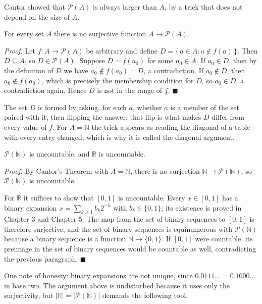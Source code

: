 Cantor showed that $\mathcal{P}(A)$ is always larger than $A$, by a trick that does not
depend on the size of $A$.

\begin{teorema}[Cantor]
For every set $A$ there is no surjective function $A \to \mathcal{P}(A)$.
\end{teorema}
\par\smallskip\noindent\textit{Proof.} Let $f : A \to \mathcal{P}(A)$ be arbitrary
and define $D = \{\, a \in A : a \notin f(a) \,\}$. Then $D \subseteq A$, so
$D \in \mathcal{P}(A)$. Suppose $D = f(a_0)$ for some $a_0 \in A$. If
$a_0 \in D$, then by the definition of $D$ we have $a_0 \notin f(a_0) = D$, a
contradiction. If $a_0 \notin D$, then $a_0 \notin f(a_0)$, which is precisely the
membership condition for $D$, so $a_0 \in D$, a contradiction again. Hence $D$ is not
in the range of $f$.
\hfill$\blacksquare${\parfillskip=0pt\par}

The set $D$ is formed by asking, for each $a$, whether $a$ is a member of the set
paired with it, then flipping the answer; that flip is what makes $D$ differ from
every value of $f$. For $A = \mathbb{N}$ the trick appears as reading the diagonal of
a table with every entry changed, which is why it is called the diagonal argument.

\begin{akibat}
$\mathcal{P}(\mathbb{N})$ is uncountable, and $\mathbb{R}$ is uncountable.
\end{akibat}
\par\smallskip\noindent\textit{Proof.} By Cantor's Theorem with $A = \mathbb{N}$,
there is no surjection $\mathbb{N} \to \mathcal{P}(\mathbb{N})$, so
$\mathcal{P}(\mathbb{N})$ is uncountable.

For $\mathbb{R}$ it suffices to show that $[0,1]$ is uncountable. Every $x \in [0,1]$
has a binary expansion $x = \sum_{k \ge 1} b_k 2^{-k}$ with $b_k \in \{0,1\}$; its
existence is proved in Chapter 3 and Chapter 5. The map from the set of binary
sequences to $[0,1]$ is therefore surjective, and the set of binary sequences is
equinumerous with $\mathcal{P}(\mathbb{N})$ because a binary sequence is a function
$\mathbb{N} \to \{0,1\}$. If $[0,1]$ were countable, its preimage in the set of binary
sequences would be countable as well, contradicting the previous paragraph.
\hfill$\blacksquare${\parfillskip=0pt\par}

One note of honesty: binary expansions are not unique, since
$0.0111\dots = 0.1000\dots$ in base two. The argument above is undisturbed because
it uses only the surjectivity, but $|\mathbb{R}| = |\mathcal{P}(\mathbb{N})|$ demands
the following tool.

